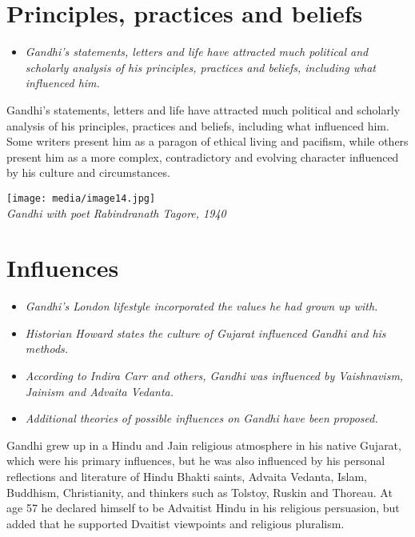 \section{Principles, practices and
beliefs}\label{principles-practices-and-beliefs}

\begin{itemize}
\item
  \emph{Gandhi's statements, letters and life have attracted much
  political and scholarly analysis of his principles, practices and
  beliefs, including what influenced him.}
\end{itemize}

Gandhi's statements, letters and life have attracted much political and
scholarly analysis of his principles, practices and beliefs, including
what influenced him. Some writers present him as a paragon of ethical
living and pacifism, while others present him as a more complex,
contradictory and evolving character influenced by his culture and
circumstances.

\texttt{[image: media/image14.jpg]}\\
\emph{Gandhi with poet Rabindranath Tagore, 1940}

\section{Influences}\label{influences}

\begin{itemize}
\item
  \emph{Gandhi's London lifestyle incorporated the values he had grown
  up with.}
\item
  \emph{Historian Howard states the culture of Gujarat influenced Gandhi
  and his methods.}
\item
  \emph{According to Indira Carr and others, Gandhi was influenced by
  Vaishnavism, Jainism and Advaita Vedanta.}
\item
  \emph{Additional theories of possible influences on Gandhi have been
  proposed.}
\end{itemize}

Gandhi grew up in a Hindu and Jain religious atmosphere in his native
Gujarat, which were his primary influences, but he was also influenced
by his personal reflections and literature of Hindu Bhakti saints,
Advaita Vedanta, Islam, Buddhism, Christianity, and thinkers such as
Tolstoy, Ruskin and Thoreau. At age 57 he declared himself to be
Advaitist Hindu in his religious persuasion, but added that he supported
Dvaitist viewpoints and religious pluralism.

